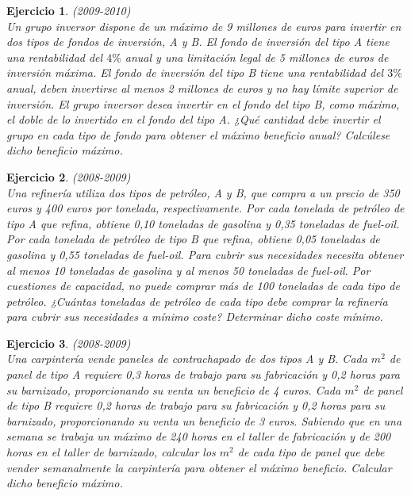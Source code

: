 \documentclass[12pt, a4paper]{amsart}
\newtheorem{ejer}{Ejercicio}
\begin{document}
\newpage

\begin{ejer}\em  (2009-2010)\\
Un grupo inversor dispone de un máximo de 9 millones de euros para invertir en dos tipos de fondos de inversión, A y B. El fondo de inversión del tipo A tiene una rentabilidad del $4\%$ anual y una limitación legal de 5 millones de euros de inversión máxima. El fondo de inversión del tipo B tiene una rentabilidad del $3\%$ anual, deben invertirse al menos 2 millones de euros y no hay límite superior de inversión. El grupo inversor desea invertir en el fondo del tipo B, como máximo, el doble de lo invertido en el fondo del tipo A. ¿Qué cantidad debe invertir el grupo en cada tipo de fondo para obtener el máximo beneficio anual? Calcúlese dicho beneficio máximo.
\end{ejer}

\begin{ejer}\em  (2008-2009)\\
Una refinería utiliza dos tipos de petróleo, A y B, que compra a un precio de 350 euros y 400 euros por tonelada, respectivamente. Por cada tonelada de petróleo de tipo A que refina, obtiene 0,10 toneladas de gasolina y 0,35 toneladas de fuel-oil. Por cada tonelada de petróleo de tipo B que refina, obtiene 0,05 toneladas de gasolina y 0,55 toneladas de fuel-oil. Para cubrir sus necesidades necesita obtener al menos 10 toneladas de gasolina y al menos 50 toneladas de fuel-oil. Por cuestiones de capacidad, no puede comprar más de 100 toneladas de cada tipo de petróleo. ¿Cuántas toneladas de petróleo de cada tipo debe comprar la refinería para cubrir sus necesidades a mínimo coste? Determinar dicho coste mínimo.
\end{ejer}

\begin{ejer}\em  (2008-2009)\\
Una carpintería vende paneles de contrachapado de dos tipos A y B. Cada $m^2$ de panel de tipo A requiere 0,3 horas de trabajo para su fabricación y 0,2 horas para su barnizado, proporcionando su venta un beneficio de 4 euros. Cada $m^2$ de panel de tipo B requiere 0,2 horas de trabajo para su fabricación y 0,2 horas para su barnizado, proporcionando su venta un beneficio de 3 euros. Sabiendo que en una semana se trabaja un máximo de 240 horas en el taller de fabricación y de 200 horas en el taller de barnizado, calcular los $m^2$ de cada tipo de panel que debe vender semanalmente la carpintería para obtener el máximo beneficio. Calcular dicho beneficio máximo.
\end{ejer}
\end{document}
